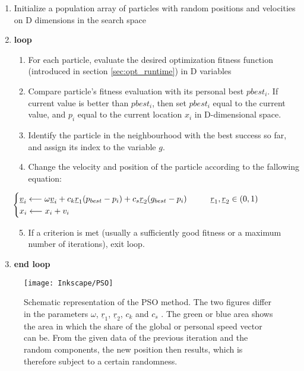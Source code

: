 \begin{enumerate}
\item Initialize a population array of particles with random positions and velocities on D dimensions in the search space
\item \textbf{loop}

\begin{enumerate}

\item  For each particle, evaluate the desired optimization fitness function (introduced in section \ref{sec:opt_runtime}) in D variables
\item  Compare particle's fitness evaluation with its personal best $pbest_i$. If current value is better than \textit{$pbest_i$}, then set $pbest_i$ equal to the current value, and $p_i$ equal to the current location $x_i$ in D-dimensional space.
\item Identify the particle in the neighbourhood with the best success so far, and assign its index to the variable $g$.
\item Change the velocity and position of the particle according to the fallowing equation:

 \begin{equation}
 \hspace{-2cm}
		\begin{cases} \underline{v}_{i} \longleftarrow \omega \underline{v}_i +c_k \underline{r}_1 (p_{best} -p_i)+c_s \underline{r}_2(g_{best}-p_i) \hspace{1cm} \underline{r}_1,\underline{r}_2 \in (0,1) \\
		 x_{i} \longleftarrow x_i +v_{i} \end{cases}
	\label{eq:pso_pseudo}
\end{equation}

\item If a criterion is met (usually a sufficiently good fitness or a maximum number of iterations), exit loop.

\end{enumerate}

\item \textbf{end loop}
\end{enumerate}

\begin{figure}[!htb]
    \centering
    \texttt{[image: Inkscape/PSO]} %
    \caption[Scheme of particle swarm optimization]{Schematic representation of the PSO method. The two figures differ in the parameters $\omega$, $\underline{r}_1$, $\underline{r}_2$, $c_k$ and $c_s$ . The green or blue area shows the area in which the share of the global or personal speed vector can be. From the given data of the previous iteration and the random components, the new position then results, which is therefore subject to a certain randomness.}
    \label{fig:flowchart}
\end{figure}


